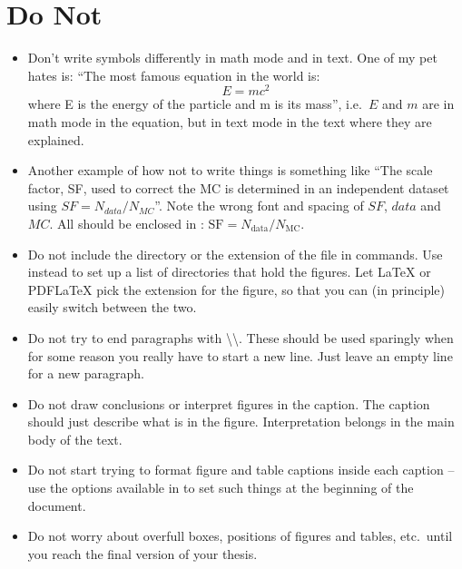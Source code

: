 \section{Do Not}
\label{sec:tips:dont}

\begin{itemize}
\item Don't write symbols differently in math mode and in text. One of
  my pet hates is:
  \enquote{The most famous equation in the world is:
  \begin{equation}
    \label{eq:emc2}
    E = m c^{2}
  \end{equation}
  where E is the energy of the particle and m is its mass}, i.e.\ $E$
  and $m$ are in math mode in the equation, but in text mode in the
  text where they are explained.
\item Another example of how not to write things is something like
  \enquote{The scale factor, SF, used to correct the MC is determined in
  an independent dataset using $SF = N_{data} / N_{MC}$}. Note the
  wrong font and spacing of $SF$, $data$ and $MC$. All should be
  enclosed in : $\text{SF} = N_{\text{data}} / N_{\text{MC}}$.
\item Do not include the directory or the extension of the file in
  commands. Use
  instead to set up a list of directories that hold the
  figures. Let \LaTeX{} or PDF\LaTeX{} pick
  the extension for the figure, so that you can (in principle) easily
  switch between the two.
\item Do not try to end paragraphs with
  \textbackslash\textbackslash. These should be used sparingly when
  for some reason you really have to start a new line. Just leave an
  empty line for a new paragraph.
\item Do not draw conclusions or interpret figures in the caption. The
  caption should just describe what is in the figure. Interpretation
  belongs in the main body of the text.
\item Do not start trying to format figure and table captions inside
  each caption -- use the options available in \KOMAScript{} to set
  such things at the beginning of the document.
\item Do not worry about overfull boxes, positions of figures
  and tables, etc.\ until you reach the final version of your thesis.
\end{itemize}


